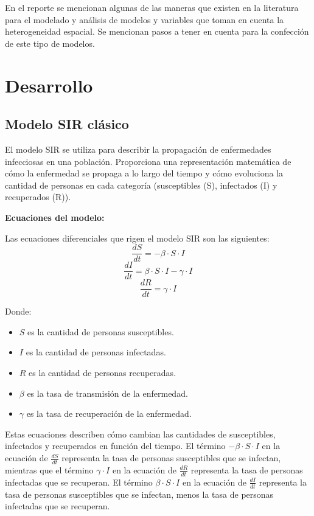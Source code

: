 \documentclass[fleqn,10pt]{SelfArx_063318} %
\begin{document}
En el reporte se mencionan algunas de las maneras que existen en la literatura para el modelado y análisis de
modelos y variables que toman en cuenta la heterogeneidad espacial. Se mencionan pasos a tener en cuenta para la
confección de este tipo de modelos.

\section{Desarrollo}

\subsection{Modelo SIR clásico}

El modelo SIR se utiliza para describir la propagación de enfermedades infecciosas en una población.
Proporciona una representación matemática de cómo la enfermedad se propaga a lo largo del tiempo y cómo
evoluciona la cantidad de personas en cada categoría (susceptibles (S), infectados (I) y recuperados (R)).

\textbf{Ecuaciones del modelo:}

Las ecuaciones diferenciales que rigen el modelo SIR son las siguientes:
\begin{equation*}
    \frac{dS}{dt} = -\beta \cdot S \cdot I
\end{equation*}
\begin{equation*}
    \frac{dI}{dt} = \beta \cdot S \cdot I - \gamma \cdot I
\end{equation*}
\begin{equation*}
    \frac{dR}{dt} = \gamma \cdot I
\end{equation*}

Donde:
\begin{itemize}
    \item $S$ es la cantidad de personas susceptibles.
    \item $I$ es la cantidad de personas infectadas.
    \item $R$ es la cantidad de personas recuperadas.
    \item $\beta$ es la tasa de transmisión de la enfermedad.
    \item $\gamma$ es la tasa de recuperación de la enfermedad.
\end{itemize}

Estas ecuaciones describen cómo cambian las cantidades de susceptibles, infectados y recuperados en función del tiempo.
El término $-\beta \cdot S \cdot I$ en la ecuación de $\frac{dS}{dt}$ representa la tasa de personas susceptibles que
se infectan, mientras que el término $\gamma \cdot I$ en la ecuación de $\frac{dR}{dt}$ representa la tasa de personas
infectadas que se recuperan. El término $\beta \cdot S \cdot I$ en la ecuación de $\frac{dI}{dt}$ representa la tasa
de personas susceptibles que se infectan, menos la tasa de personas infectadas que se recuperan.
\end{document}
